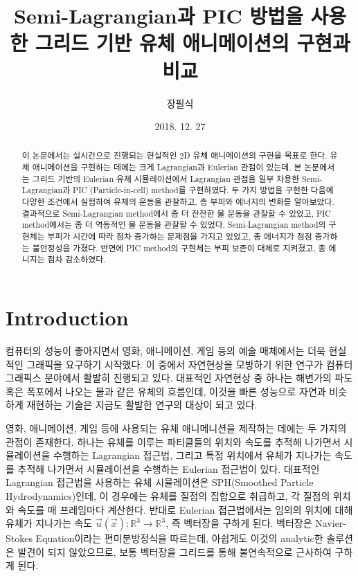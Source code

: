 \documentclass[12pt, A4]{article}
\title{Semi-Lagrangian과 PIC 방법을 사용한 그리드 기반 유체 애니메이션의 구현과 비교}
\author{장필식}
\date{2018. 12. 27}
\begin{document}
\maketitle

\begin{abstract}

  이 논문에서는 실시간으로 진행되는 현실적인 2D 유체 애니메이션의 구현을 목표로 한다. 유체 애니메이션을 구현하는 데에는 크게 Lagrangian과 Eulerian 관점이 있는데, 본 논문에서는 그리드 기반의 Eulerian 유체 시뮬레이션에서 Lagrangian 관점을 일부 차용한 Semi-Lagrangian과 PIC (Particle-in-cell) method를 구현하였다. 두 가지 방법을 구현한 다음에 다양한 조건에서 실험하여 유체의 운동을 관찰하고, 총 부피와 에너지의 변화를 알아보았다. 결과적으로 Semi-Lagrangian method에서 좀 더 잔잔한 물 운동을 관찰할 수 있었고, PIC method에서는 좀 더 역동적인 물 운동을 관찰할 수 있었다. Semi-Lagrangian method의 구현체는 부피가 시간에 따라 점차 증가하는 문제점을 가지고 있었고, 총 에너지가 점점 증가하는 불안정성을 가졌다. 반면에 PIC method의 구현체는 부피 보존이 대체로 지켜졌고, 총 에니지는 점차 감소하였다.

\end{abstract}

\newpage

\tableofcontents

\newpage

\section{Introduction}

컴퓨터의 성능이 좋아지면서 영화, 애니메이션, 게임 등의 예술 매체에서는 더욱 현실적인 그래픽을 요구하기 시작했다. 이 중에서 자연현상을 모방하기 위한 연구가 컴퓨터 그래픽스 분야에서 활발히 진행되고 있다. 대표적인 자연현상 중 하나는 해변가의 파도 혹은 폭포에서 나오는 물과 같은 유체의 흐름인데, 이것을 빠른 성능으로 자연과 비슷하게 재현하는 기술은 지금도 활발한 연구의 대상이 되고 있다.

영화, 애니메이션, 게임 등에 사용되는 유체 애니메니션을 제작하는 데에는 두 가지의 관점이 존재한다. 하나는 유체를 이루는 파티클들의 위치와 속도를 추적해 나가면서 시뮬레이션을 수행하는 Lagrangian 접근법, 그리고 특정 위치에서 유체가 지나가는 속도를 추적해 나가면서 시뮬레이션을 수행하는 Eulerian 접근법이 있다. 대표적인 Lagrangian 접근법을 사용하는 유체 시뮬레이션은 SPH(Smoothed Particle Hydrodynamics)인데, 이 경우에는 유체를 질점의 집합으로 취급하고, 각 질점의 위치와 속도를 매 프레임마다 계산한다. 반대로 Eulerian 접근법에서는 임의의 위치에 대해 유체가 지나가는 속도 $\vec{u}(\vec{x}): \mathbb{R}^3 \rightarrow \mathbb{R}^3$, 즉 벡터장을 구하게 된다. 벡터장은 Navier-Stokes Equation이라는 편미분방정식을 따르는데, 아쉽게도 이것의 analytic한 솔루션은 발견이 되지 않았으므로, 보통 벡터장을 그리드를 통해 불연속적으로 근사하여 구하게 된다. 
\end{document}
